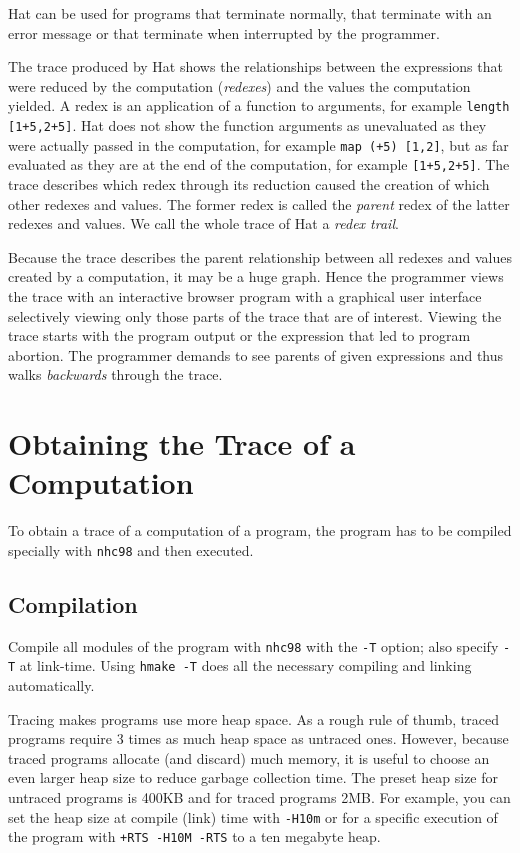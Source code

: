 \documentclass[12pt]{article}
\begin{document}
Hat can be used for programs that terminate normally, that terminate with an error message or that terminate when interrupted by the programmer.


The trace produced by Hat shows the relationships between the expressions that were reduced by the computation (\emph{redexes}) and the values the computation yielded. A redex is an application of a function to arguments, for example \texttt{length [1+5,2+5]}. Hat does not show the function arguments as unevaluated as they were actually passed in the computation, for example \texttt{map (+5) [1,2]}, but as far evaluated as they are at the end of the computation, for example \texttt{[1+5,2+5]}. The trace describes which redex through its reduction caused the creation of which other redexes and values. The former redex is called the \emph{parent} redex of the latter redexes and values. We call the whole trace of Hat a \emph{redex trail}.

Because the trace describes the parent relationship between all redexes and values created by a computation, it may be a huge graph. Hence the programmer views the trace with an interactive browser program with a graphical user interface selectively viewing only those parts of the trace that are of interest.
Viewing the trace starts with the program output or the expression that led to program abortion. The programmer demands to see parents of given expressions and thus walks \emph{backwards} through the trace.



\section{Obtaining the Trace of a Computation}

To obtain a trace of a computation of a program, the program has to be compiled specially with \texttt{nhc98} and then executed.


\subsection{Compilation}

Compile all modules of the program with \texttt{nhc98} with the \texttt{-T} option; also specify \texttt{-T} at link-time.  Using \texttt{hmake -T} does
all the necessary compiling and linking automatically.

Tracing makes programs use more heap space. As a rough rule of thumb, traced programs require 3 times as much heap space as untraced ones. However, because traced programs allocate (and discard) much memory, it is useful to choose an even larger heap size to reduce garbage collection time.
The preset heap size for untraced programs is 400KB and for traced programs 2MB.
For example, you can set the heap size at compile (link) time with \texttt{-H10m} or for a specific execution of the program with \texttt{+RTS -H10M -RTS} to a ten megabyte heap.
\end{document}
